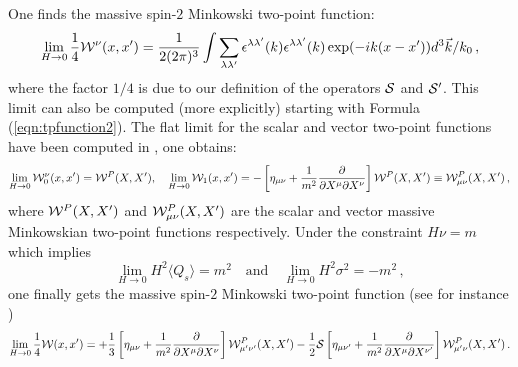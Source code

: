 \documentclass[a4paper,11pt,showpacs,preprintnumbers]{revtex4}
\begin{document}
One finds the massive spin-$2$  Minkowski two-point function:
\begin{eqnarray}
\lim_{H\rightarrow 0}\frac{1}{4}{\cal W}^\nu(x,x')=
\frac{1}{{2(2\pi)^3}} \int
\sum_{\lambda\lambda'}\epsilon^{\lambda\lambda'}(k)\epsilon^{\lambda\lambda'}(k)
\exp(-ik(x-x'))d^{3}\vec{k}/k_{0} \,,
\end{eqnarray}
where the factor $1/4$ is due to our definition of the operators
${\cal S}$ and ${\cal S}'$. This limit can also be computed (more
explicitly) starting with Formula (\ref{eqn:tpfunction2}). The
flat limit for the scalar and vector two-point functions have been
computed in \cite{brmo,gata}, one obtains:
\begin{equation}
\lim_{H\rightarrow 0}{\cal W}^{\nu}_{0}(x,x')={\cal
W}^{P}(X,X'),\quad\lim_{H\rightarrow 0}{\cal
W}_{1}(x,x')=-\left[\eta_{\mu\nu}+\frac{1}{m^{2}}
\frac{\partial}{\partial X^{\mu}\partial X^{\nu}}\right] {\cal
W}^{P}(X,X')\equiv{\cal W}_{\mu\nu}^{P}(X,X')\,,
\end{equation}
where ${\cal W}^{P}(X,X')$ and ${\cal W}_{\mu\nu}^{P}(X,X')$ are
the scalar and vector massive  Minkowskian two-point functions
respectively. Under the constraint $H\nu=m$ which implies
\begin{equation}
\lim_{H\rightarrow 0}H^{2}\langle
Q_{s}\rangle=m^{2}\quad\mbox{and}\quad \lim_{H\rightarrow
0}H^{2}\sigma^{2}=-m^{2}\,,
\end{equation}
one finally gets the massive spin-$2$ Minkowski two-point function
(see for instance \cite{higu1})
\begin{equation}
\lim_{H\rightarrow 0}\frac{1}{4}{\cal W}(x,x')= +\frac{1}{3}
\left[ \eta_{\mu\nu}+\frac{1}{m^{2}} \frac{\partial}{\partial
X^{\mu}\partial X^{\nu}}\right]{\cal
W}_{\mu'\nu'}^{P}(X,X')-\frac{1}{2}{\cal S} \left[
\eta_{\mu\nu'}+\frac{1}{m^{2}} \frac{\partial}{\partial
X^{\mu}\partial X^{\nu'}}\right] {\cal W}_{\mu'\nu}^{P}(X,X')\,.
\end{equation}
\end{document}

